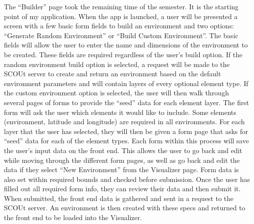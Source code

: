 The “Builder” page took the remaining time of the semester.
It is the starting point of my application.
When the app is launched, a user will be presented a screen with a few basic form fields to build an environment and two options: “Generate Random Environment” or “Build Custom Environment”.
The basic fields will allow the user to enter the name and dimensions of the environment to be created.
These fields are required regardless of the user’s build option.
If the random environment build option is selected, a request will be made to the SCOUt server to create and return an environment based on the default environment parameters and will contain layers of every optional element type.
If the custom environment option is selected, the user will then walk through several pages of forms to provide the “seed” data for each element layer.
The first form will ask the user which elements it would like to include.
Some elements (environment, latitude and longitude) are required in all environments.
For each layer that the user has selected, they will then be given a form page that asks for “seed” data for each of the element types.
Each form within this process will save the user’s input data on the front end.
This allows the user to go back and edit while moving through the different form pages, as well as go back and edit the data if they select “New Environment” from the Visualizer page.
Form data is also set within required bounds and checked before submission.
Once the user has filled out all required form info, they can review their data and then submit it.
When submitted, the front end data is gathered and sent in a request to the SCOUt server.
An environment is then created with these specs and returned to the front end to be loaded into the Visualizer.


